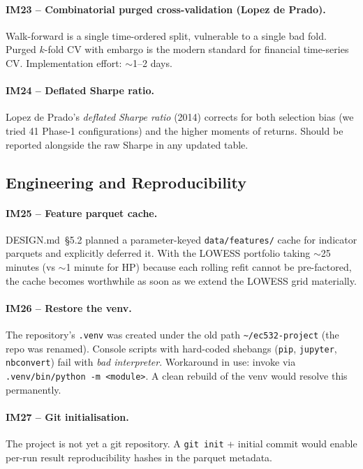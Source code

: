 \documentclass[11pt,a4paper]{article}
\begin{document}
\paragraph{IM23 -- Combinatorial purged cross-validation (Lopez de Prado).}
Walk-forward is a single time-ordered split, vulnerable to a single bad
fold. Purged $k$-fold CV with embargo is the modern standard for financial
time-series CV. Implementation effort: $\sim$1--2 days.

\paragraph{IM24 -- Deflated Sharpe ratio.} Lopez de Prado's \emph{deflated
Sharpe ratio} (2014) corrects for both selection bias (we tried 41 Phase-1
configurations) and the higher moments of returns. Should be reported
alongside the raw Sharpe in any updated table.

\subsection{Engineering and Reproducibility}

\paragraph{IM25 -- Feature parquet cache.} DESIGN.md~\S5.2 planned a
parameter-keyed \texttt{data/features/} cache for indicator parquets and
explicitly deferred it. With the LOWESS portfolio taking $\sim$25 minutes
(vs $\sim$1 minute for HP) because each rolling refit cannot be
pre-factored, the cache becomes worthwhile as soon as we extend the LOWESS
grid materially.

\paragraph{IM26 -- Restore the venv.} The repository's \texttt{.venv} was
created under the old path \texttt{\textasciitilde/ec532-project} (the
repo was renamed). Console scripts with hard-coded shebangs (\texttt{pip},
\texttt{jupyter}, \texttt{nbconvert}) fail with \emph{bad interpreter}.
Workaround in use: invoke via \texttt{.venv/bin/python -m <module>}.
A clean rebuild of the venv would resolve this permanently.

\paragraph{IM27 -- Git initialisation.} The project is not yet a git
repository. A \texttt{git init} + initial commit would enable per-run
result reproducibility hashes in the parquet metadata.
\end{document}

